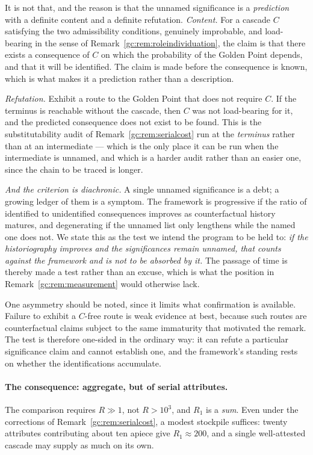 \begin{remark}
It is not that, and the reason is that the unnamed significance is a
\emph{prediction} with a definite content and a definite refutation. \emph{Content.} For a cascade $C$ satisfying the two admissibility
conditions, genuinely improbable, and load-bearing in the sense of
Remark~\ref{gc:rem:roleindividuation}, the claim is that there exists
a consequence of $C$ on which the probability of the Golden Point
depends, and that it will be identified. The claim is made before the
consequence is known, which is what makes it a prediction rather than a
description.

\emph{Refutation.} Exhibit a route to the Golden Point that does not
require $C$. If the terminus is reachable without the cascade, then
$C$ was not load-bearing for it, and the predicted consequence does not
exist to be found. This is the substitutability audit of
Remark~\ref{gc:rem:serialcost} run at the \emph{terminus} rather than at
an intermediate --- which is the only place it can be run when the
intermediate is unnamed, and which is a harder audit rather than an
easier one, since the chain to be traced is longer.

\emph{And the criterion is diachronic.} A single unnamed significance
is a debt; a growing ledger of them is a symptom. The framework is
progressive if the ratio of identified to unidentified consequences
improves as counterfactual history matures, and degenerating if the
unnamed list only lengthens while the named one does not. We state this
as the test we intend the program to be held to: \emph{if the
historiography improves and the significances remain unnamed, that
counts against the framework and is not to be absorbed by it.} The
passage of time is thereby made a test rather than an excuse, which is
what the position in Remark~\ref{gc:rem:measurement} would otherwise
lack.

One asymmetry should be noted, since it limits what confirmation is
available. Failure to exhibit a $C$-free route is weak evidence at best,
because such routes are counterfactual claims subject to the same
immaturity that motivated the remark. The test is therefore one-sided in
the ordinary way: it can refute a particular significance claim and
cannot establish one, and the framework's standing rests on
whether the identifications accumulate.

\paragraph{The consequence: aggregate, but of serial attributes.} The
comparison requires $R\gg1$, not $R>10^{3}$, and $R_1$ is a \emph{sum}.
Even under the corrections of Remark~\ref{gc:rem:serialcost}, a modest
stockpile suffices: twenty attributes contributing about ten apiece
give $R_1\approx200$, and a single well-attested cascade may supply as
much on its own.


\end{remark}
